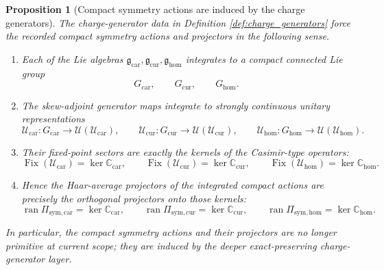 \documentclass[11pt]{article}
\newcommand{\RootTensorClass}{\mathscr U_{\mathrm{car}}}
\newcommand{\RootRelabelClass}{\mathscr U_{\mathrm{cur}}}
\newcommand{\RootFreeClass}{\mathscr U_{\mathrm{hom}}}
\newcommand{\TensorSymProj}{\Pi_{\mathrm{sym,car}}}
\newcommand{\CurSymProj}{\Pi_{\mathrm{sym,cur}}}
\newcommand{\HomSymProj}{\Pi_{\mathrm{sym,hom}}}
\newcommand{\TensorSymGroup}{G_{\mathrm{car}}}
\newcommand{\CurSymGroup}{G_{\mathrm{cur}}}
\newcommand{\HomSymGroup}{G_{\mathrm{hom}}}
\newcommand{\TensorSymAct}{\mathscr U_{\mathrm{car}}}
\newcommand{\CurSymAct}{\mathscr U_{\mathrm{cur}}}
\newcommand{\HomSymAct}{\mathscr U_{\mathrm{hom}}}
\newcommand{\TensorChargeAlg}{\mathfrak g_{\mathrm{car}}}
\newcommand{\CurChargeAlg}{\mathfrak g_{\mathrm{cur}}}
\newcommand{\HomChargeAlg}{\mathfrak g_{\mathrm{hom}}}
\newcommand{\TensorCasimir}{\mathbb C_{\mathrm{car}}}
\newcommand{\CurCasimir}{\mathbb C_{\mathrm{cur}}}
\newcommand{\HomCasimir}{\mathbb C_{\mathrm{hom}}}
\newcommand{\Fix}{\operatorname{Fix}}
\newtheorem{proposition}{Proposition}
\begin{document}
\begin{proposition}[Compact symmetry actions are induced by the charge generators]
\label{prop:charge_to_compact}
The charge-generator data in Definition \ref{def:charge_generators} force the recorded compact symmetry actions and projectors in the following sense.
\begin{enumerate}
    \item Each of the Lie algebras \(\TensorChargeAlg,\CurChargeAlg,\HomChargeAlg\) integrates to a compact connected Lie group
    \[
    \TensorSymGroup,\qquad
    \CurSymGroup,\qquad
    \HomSymGroup.
    \]
    \item The skew-adjoint generator maps integrate to strongly continuous unitary representations
    \[
    \TensorSymAct:\TensorSymGroup\to\mathcal U(\RootTensorClass),\qquad
    \CurSymAct:\CurSymGroup\to\mathcal U(\RootRelabelClass),\qquad
    \HomSymAct:\HomSymGroup\to\mathcal U(\RootFreeClass).
    \]
    \item Their fixed-point sectors are exactly the kernels of the Casimir-type operators:
    \begin{equation}
    \Fix(\TensorSymAct)=\ker\TensorCasimir,
    \qquad
    \Fix(\CurSymAct)=\ker\CurCasimir,
    \qquad
    \Fix(\HomSymAct)=\ker\HomCasimir.
    \label{eq:fix_from_casimir}
    \end{equation}
    \item Hence the Haar-average projectors of the integrated compact actions are precisely the orthogonal projectors onto those kernels:
    \begin{equation}
    \operatorname{ran}\TensorSymProj=\ker\TensorCasimir,
    \qquad
    \operatorname{ran}\CurSymProj=\ker\CurCasimir,
    \qquad
    \operatorname{ran}\HomSymProj=\ker\HomCasimir.
    \label{eq:symproj_from_casimir}
    \end{equation}
\end{enumerate}
In particular, the compact symmetry actions and their projectors are no longer primitive at current scope; they are induced by the deeper exact-preserving charge-generator layer.
\end{proposition}
\end{document}
